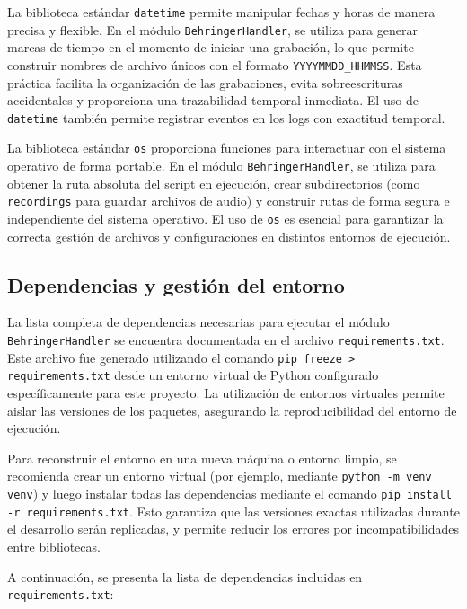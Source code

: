 La biblioteca estándar \texttt{datetime} permite manipular fechas y horas de manera precisa y flexible. En el módulo  \texttt{BehringerHandler}, se utiliza para generar marcas de tiempo en el momento de iniciar una grabación, lo que permite construir nombres de archivo únicos con el formato \texttt{YYYYMMDD\_HHMMSS}. Esta práctica facilita la organización de las grabaciones, evita sobreescrituras accidentales y proporciona una trazabilidad temporal inmediata. El uso de \texttt{datetime} también permite registrar eventos en los logs con exactitud temporal.

La biblioteca estándar \texttt{os} proporciona funciones para interactuar con el sistema operativo de forma portable. En el módulo \texttt{BehringerHandler}, se utiliza para obtener la ruta absoluta del script en ejecución, crear subdirectorios (como \texttt{recordings} para guardar archivos de audio) y construir rutas de forma segura e independiente del sistema operativo.  El uso de \texttt{os} es esencial para garantizar la correcta gestión de archivos y configuraciones en distintos entornos de ejecución.


\subsection{Dependencias y gestión del entorno}

La lista completa de dependencias necesarias para ejecutar el módulo \texttt{BehringerHandler} se encuentra documentada en el archivo \texttt{requirements.txt}. Este archivo fue generado utilizando el comando \texttt{pip freeze > requirements.txt} desde un entorno virtual de Python configurado específicamente para este proyecto. La utilización de entornos virtuales permite aislar las versiones de los paquetes, asegurando la reproducibilidad del entorno de ejecución.

Para reconstruir el entorno en una nueva máquina o entorno limpio, se recomienda crear un entorno virtual (por ejemplo, mediante \texttt{python -m venv venv}) y luego instalar todas las dependencias mediante el comando \texttt{pip install -r requirements.txt}. Esto garantiza que las versiones exactas utilizadas durante el desarrollo serán replicadas, y permite reducir los  errores por incompatibilidades entre bibliotecas.

A continuación, se presenta la lista de dependencias incluidas en \texttt{requirements.txt}:

